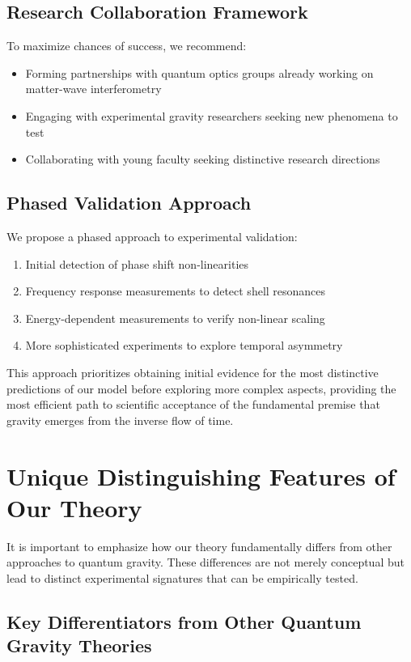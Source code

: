 \documentclass[12pt,a4paper]{article}
\begin{document}
\subsection{Research Collaboration Framework}

To maximize chances of success, we recommend:
\begin{itemize}
    \item Forming partnerships with quantum optics groups already working on matter-wave interferometry
    \item Engaging with experimental gravity researchers seeking new phenomena to test
    \item Collaborating with young faculty seeking distinctive research directions
\end{itemize}

\subsection{Phased Validation Approach}

We propose a phased approach to experimental validation:
\begin{enumerate}
    \item Initial detection of phase shift non-linearities
    \item Frequency response measurements to detect shell resonances
    \item Energy-dependent measurements to verify non-linear scaling
    \item More sophisticated experiments to explore temporal asymmetry
\end{enumerate}

This approach prioritizes obtaining initial evidence for the most distinctive predictions of our model before exploring more complex aspects, providing the most efficient path to scientific acceptance of the fundamental premise that gravity emerges from the inverse flow of time.

\section{Unique Distinguishing Features of Our Theory}

It is important to emphasize how our theory fundamentally differs from other approaches to quantum gravity. These differences are not merely conceptual but lead to distinct experimental signatures that can be empirically tested.

\subsection{Key Differentiators from Other Quantum Gravity Theories}
\end{document}
